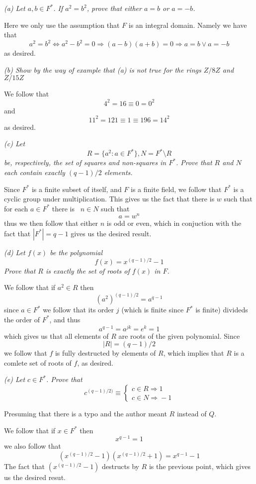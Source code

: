 \documentclass[11pt,oneside,titlepage]{book}
\DeclareMathOperator \lra {\Leftrightarrow}
\DeclareMathOperator \ra {\Rightarrow}
\newcommand{\set}[1]{\{ #1 \}}
\begin{document}
\textit{(a) Let $a, b \in F^*$. If $a^2 = b^2$, prove that either $a =
  b$ or $a = -b$.}

Here we only use the assumption that $F$ is an integral domain. Namely we have that
$$a^2 = b^2 \lra a^2 - b^2 = 0 \ra (a - b) (a + b) = 0 \ra a = b \lor a = -b$$
as desired.

\textit{(b) Show by the way of example that (a) is not true for the
  rings $Z/8Z$ and $Z/15Z$}

We follow that
$$4^2 = 16 \equiv 0 = 0^2$$
and
$$11^2 = 121 \equiv 1 \equiv 196 = 14^2$$
as desired.

\textit{(c) Let
  $$R = \set{a^2: a \in F^*}, N = F^* \setminus R$$
  be, respectively, the set of squares and non-squares in $F^*$. Prove
  that $R$ and $N$ each contain exactly $(q - 1) / 2$ elements.
}

Since $F^*$ is a finite subset of itself, and $F$ is a finite field,
we follow that $F^*$ is a cyclic group under multiplication. This
gives us the fact that there is $w$ such that for each $a \in F^*$
there is \ $n \in N$ such that
$$a = w^n$$
thus we then follow that either $n$ is odd or even, which in
conjuction with the fact that $|F^*| = q - 1$ gives us the desired
result.

\textit{(d) Let $f(x)$ be the polynomial
  $$f(x) = x^{(q - 1)/2} - 1$$
  Prove that $R$ is exactly the set of roots of $f(x)$ in $F$.}

We follow that if $a^2 \in R$ then
$$(a^2)^{(q - 1)/2} = a^{q - 1}$$
since $a \in F^*$ we follow that its order $j$ (which is finite since
$F^*$ is finite) divideds the order of $F^*$, and thus
$$a^{q - 1} = a^{jk} = e^k = 1$$
which gives us that all elements of $R$ are roots of the given
polynomial. Since
$$|R| = (q - 1)  / 2$$
we follow that $f$ is fully destructed by elements of $R$, which
implies that $R$ is a comlete set of roots of $f$, as desired.

\textit{(e) Let $c \in F^*$. Prove that
$$c^{(q - 1)/2)} \equiv
  \begin{cases}
    c \in R \ra 1 \\
    c \in N \ra -1
  \end{cases}
$$}

Presuming that there is a typo and the author meant $R$ instead of $Q$.

We follow that if $x \in F^*$ then
$$x^{q - 1} = 1$$
we also follow that
$$(x^{(q - 1)/2} - 1)(x^{(q - 1)/2} + 1) = x^{q - 1} - 1$$
The fact that $(x^{(q - 1)/2} - 1)$ destructs by $R$ is the previous
point, which gives us the desired resut.
\end{document}
